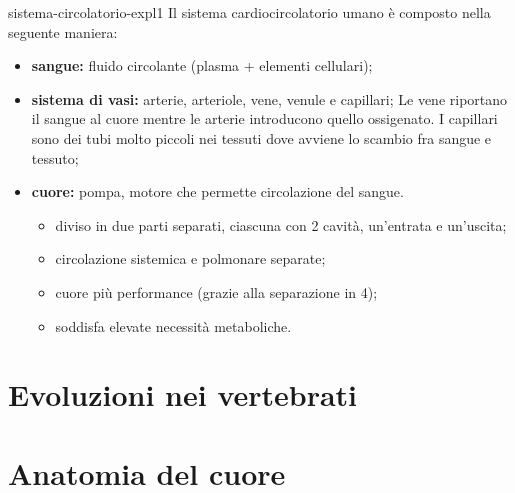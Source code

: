 \documentclass[preview]{standalone}
\begin{document}
\begin{snippet}{sistema-circolatorio-expl1}
    Il sistema cardiocircolatorio umano è composto nella seguente maniera:
    \begin{itemize}
        \item \textbf{sangue:} fluido circolante (plasma + elementi cellulari);
        \item \textbf{sistema di vasi:} arterie, arteriole, vene, venule e capillari;
            Le vene riportano il sangue al cuore mentre le arterie introducono quello ossigenato.
            I capillari sono dei tubi molto piccoli nei tessuti dove avviene lo scambio fra sangue e tessuto;
        \item \textbf{cuore:} pompa, motore che permette circolazione del sangue.
            \begin{itemize}
                \item diviso in due parti separati, ciascuna con 2 cavità, un'entrata e un'uscita;
                \item circolazione sistemica e polmonare separate;
                \item cuore più performance (grazie alla separazione in 4);
                \item soddisfa elevate necessità metaboliche.
            \end{itemize}
    \end{itemize}
\end{snippet}



\section{Evoluzioni nei vertebrati}


\section{Anatomia del cuore}

\end{document}
